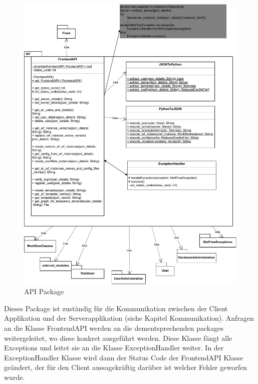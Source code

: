 \subsubsection{}
\begin{figure}[h]
    \includegraphics[width=1\textwidth]{res/api.drawio.pdf}
    \caption{API Package}
\end{figure}
Dieses Package ist zuständig für die Kommunikation zwischen der Client Applikation und der Serverapplikation (siehe Kapitel 
Kommunikation). Anfragen an die Klasse FrontendAPI werden an die dementsprechenden packages weitergeleitet, wo diese konkret 
ausgeführt werden. Diese Klasse fängt alle Exceptions und leitet sie an die Klasse ExceptionHandler weiter.
In der ExceptionHandler Klasse wird dann der Status Code der FrontendAPI Klasse geändert, der für den Client aussagekräftig
darüber ist welcher Fehler geworfen wurde.


